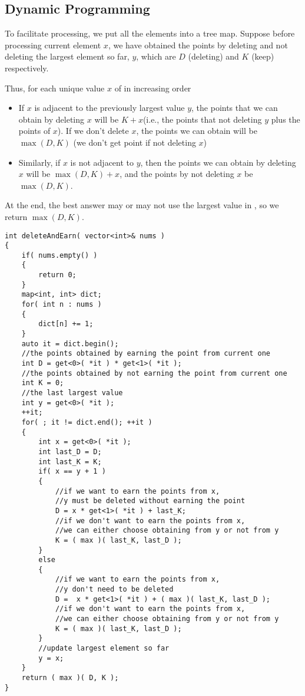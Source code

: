 \subsection{Dynamic Programming}
To facilitate processing, we put all the elements into a tree map. Suppose before processing current element $x$, we have obtained the points by deleting and not deleting the largest element so far, $y$, which are $D$ (deleting) and $K$ (keep) respectively.

Thus, for each unique value $x$ of  in increasing order

\begin{itemize}
\item If $x$ is adjacent to the previously largest value $y$, the points that we can obtain by deleting $x$ will be $K+x$(i.e., the points that not deleting $y$ plus the points of $x$). If we don't delete $x$, the points we can obtain will be $\max(D, K)$ (we don't get point if not deleting $x$)
\item Similarly, if $x$ is not adjacent to $y$, then the points we can obtain by deleting $x$ will be $\max(D, K)+x$, and the points by not deleting $x$ be $\max(D, K)$.

\end{itemize}
At the end, the best answer may or may not use the largest value in , so we return $\max(D, K)$.

\setcounter{lstlisting}{0}
\begin{lstlisting}[style=customc, caption={Dynamic Programming}]
int deleteAndEarn( vector<int>& nums )
{
    if( nums.empty() )
    {
        return 0;
    }
    map<int, int> dict;
    for( int n : nums )
    {
        dict[n] += 1;
    }
    auto it = dict.begin();
    //the points obtained by earning the point from current one
    int D = get<0>( *it ) * get<1>( *it );
    //the points obtained by not earning the point from current one
    int K = 0;
    //the last largest value
    int y = get<0>( *it );
    ++it;
    for( ; it != dict.end(); ++it )
    {
        int x = get<0>( *it );
        int last_D = D;
        int last_K = K;
        if( x == y + 1 )
        {
            //if we want to earn the points from x,
            //y must be deleted without earning the point
            D = x * get<1>( *it ) + last_K;
            //if we don't want to earn the points from x,
            //we can either choose obtaining from y or not from y
            K = ( max )( last_K, last_D );
        }
        else
        {
            //if we want to earn the points from x,
            //y don't need to be deleted
            D =  x * get<1>( *it ) + ( max )( last_K, last_D );
            //if we don't want to earn the points from x,
            //we can either choose obtaining from y or not from y
            K = ( max )( last_K, last_D );
        }
        //update largest element so far
        y = x;
    }
    return ( max )( D, K );
}
\end{lstlisting}